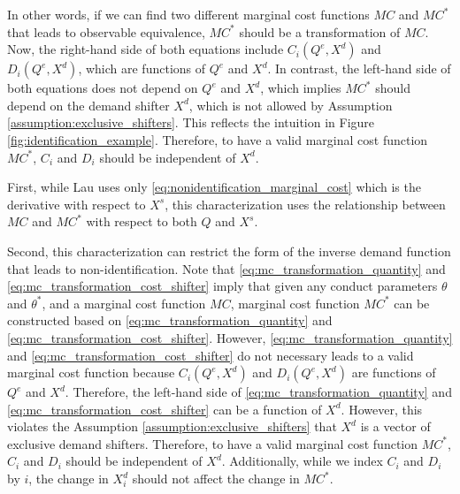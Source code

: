 \documentclass[11pt, a4paper]{article}
\theoremstyle{remark}
\begin{document}
In other words, if we can find two different marginal cost functions $MC$ and $MC^{*}$ that leads to observable equivalence, $MC^{*}$ should be a transformation of $MC$.
Now, the right-hand side of both equations include $C_i(Q^e, X^{d})$ and $D_i(Q^e, X^{d})$, which are functions of $Q^e$ and $X^{d}$.
In contrast, the left-hand side of both equations does not depend on $Q^e$ and $X^{d}$, which implies $MC^{*}$ should depend on the demand shifter $X^{d}$, which is not allowed by Assumption \ref{assumption:exclusive_shifters}.
This reflects the intuition in Figure \ref{fig:identification_example}.
Therefore, to have a valid marginal cost function $MC^{*}$, $C_i$ and $D_i$ should be independent of $X^{d}$.



First, while Lau uses only \eqref{eq:nonidentification_marginal_cost} which is the derivative with respect to $X^{s}$, this characterization uses the relationship between $MC$ and $MC^{*}$ with respect to both $Q$ and $X^{s}$.

Second, this characterization can restrict the form of the inverse demand function that leads to non-identification.
Note that \eqref{eq:mc_transformation_quantity} and \eqref{eq:mc_transformation_cost_shifter} imply that given any conduct parameters $\theta$ and $\theta^{*}$, and a marginal cost function $MC$, marginal cost function $MC^{*}$ can be constructed based on \eqref{eq:mc_transformation_quantity} and \eqref{eq:mc_transformation_cost_shifter}.
However, \eqref{eq:mc_transformation_quantity} and \eqref{eq:mc_transformation_cost_shifter} do not necessary leads to a valid marginal cost function because $C_i(Q^e, X^{d})$ and $D_i(Q^e, X^{d})$ are functions of $Q^e$ and $X^{d}$.
Therefore, the left-hand side of \eqref{eq:mc_transformation_quantity} and \eqref{eq:mc_transformation_cost_shifter} can be a function of $X^{d}$.
However, this violates the Assumption \ref{assumption:exclusive_shifters} that $X^{d}$ is a vector of exclusive demand shifters.
Therefore, to have a valid marginal cost function $MC^{*}$, $C_i$ and $D_i$ should be independent of $X^{d}$.
Additionally, while we index $C_i$ and $D_i$ by $i$, the change in $X^{d}_i$ should not affect the change in $MC^{*}$.
\end{document}
